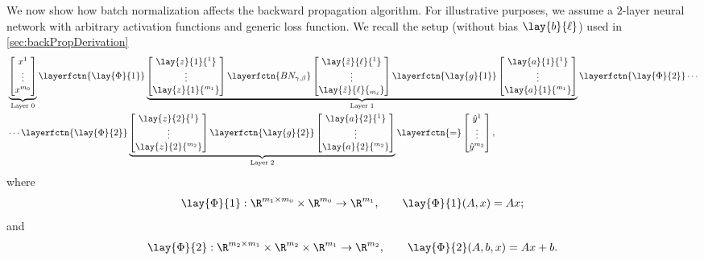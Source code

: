 We now show how batch normalization affects the backward propagation algorithm.  For illustrative purposes, we assume a $2$-layer neural network with arbitrary activation functions and generic loss function.  We recall the setup (without bias $\lay{b}{\ell}$) used in \cref{sec:backPropDerivation}
\begin{align*}
	&\underbrace{\begin{bmatrix}
		x^1\\
		\vdots\\
		x^{m_0}
		\end{bmatrix}}_{\text{Layer } 0}
	\layerfctn{\lay{\Phi}{1}}\underbrace{\begin{bmatrix}
			\lay{z}{1}{^1}\\
			\vdots\\
			\lay{z}{1}{^{m_1}}
			\end{bmatrix}
			\layerfctn{BN_{\gamma,\beta}}
		\begin{bmatrix}
			\lay{\tilde{z}}{\ell}{^1}\\
			\vdots\\
			\lay{\tilde{z}}{\ell}{_{m_\ell}}
		\end{bmatrix}
			\layerfctn{\lay{g}{1}}
			\begin{bmatrix}
			\lay{a}{1}{^1}\\
			\vdots\\
			\lay{a}{1}{^{m_1}}
			\end{bmatrix}}_{\text{Layer } 1}\layerfctn{\lay{\Phi}{2}}\cdots\\
	&\cdots\layerfctn{\lay{\Phi}{2}}
	\underbrace{\begin{bmatrix}
		\lay{z}{2}{^1}\\
		\vdots\\
		\lay{z}{2}{^{m_2}}
		\end{bmatrix}\layerfctn{\lay{g}{2}}
		\begin{bmatrix}
			\lay{a}{2}{^1}\\
			\vdots\\
			\lay{a}{2}{^{m_2}}
		\end{bmatrix}}_{\text{Layer } 2}\layerfctn{=}\begin{bmatrix}
		\hat{y}^1\\
		\vdots\\
		\hat{y}^{m_2}
	\end{bmatrix},
\end{align*}
where
$$\lay{\Phi}{1}:\R^{m_1\times m_0}\times\R^{m_0}\to\R^{m_1},\qquad\lay{\Phi}{1}(A,x)=Ax;$$
and
$$\lay{\Phi}{2}:\R^{m_2\times m_1}\times\R^{m_2}\times\R^{m_1}\to\R^{m_2},\qquad\lay{\Phi}{2}(A,b,x)=Ax+b.$$
